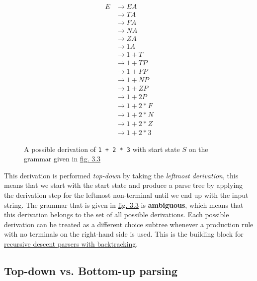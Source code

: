 \begin{figure}[h]
    \begin{equation}
        \begin{split}
            E &\rightarrow EA\\
            &\rightarrow TA\\
            &\rightarrow FA\\
            &\rightarrow NA\\
            &\rightarrow ZA\\
            &\rightarrow 1 A\\
            &\rightarrow 1 + T\\
            &\rightarrow 1 + TP\\
            &\rightarrow 1 + FP\\
            &\rightarrow 1 + NP\\
            &\rightarrow 1 + ZP\\
            &\rightarrow 1 + 2 P\\
            &\rightarrow 1 + 2 * F\\
            &\rightarrow 1 + 2 * N\\
            &\rightarrow 1 + 2 * Z\\
            &\rightarrow 1 + 2 * 3
        \end{split}
        \nonumber
    \end{equation}
    \vspace{-1.5em}
    \cprotect\caption{\label{fig:3.4}A possible derivation of \verb|1 + 2 * 3| with start state $S$ on the grammar given in \hyperref[fig:3.3]{fig. 3.3}}
\end{figure}

This derivation is performed \textit{top-down} by taking the \textit{leftmost derivation}, this means that we start with the start state and produce a parse tree by applying the derivation step for the leftmost non-terminal until we end up with the input string. The grammar that is given in \hyperref[fig:3.3]{fig. 3.3} is \textbf{ambiguous}, which means that this derivation belongs to the set of all possible derivations. Each possible derivation can be treated as a different choice subtree whenever a production rule with no terminals on the right-hand side is used. This is the building block for \hyperref[sec:top-down]{recursive descent parsers with backtracking}.

\subsection{Top-down vs. Bottom-up parsing}

